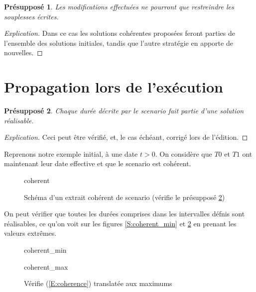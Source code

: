 \documentclass[10pt,a4paper]{article}
\newtheorem{presup}{Présupposé}
\begin{document}
\begin{presup}
Les modifications effectuées ne pourront que restreindre les souplesses écrites. \label{P:modif}
\end{presup}
\begin{proof}[Explication]
Dans ce cas les solutions cohérentes proposées feront parties de l'ensemble des solutions initiales, tandis que l'autre stratégie en apporte de nouvelles.
\end{proof}

\section{Propagation lors de l'exécution}

\begin{presup}
Chaque durée décrite par le scenario fait partie d'une solution réalisable. \label{P:coherent}
\end{presup}
\begin{proof}[Explication]
Ceci peut être vérifié, et, le cas échéant, corrigé lors de l'édition.
\end{proof}

Reprenons notre exemple initial, à une date $t>0$. On considère que $T0$ et $T1$ ont maintenant leur date effective et que le scenario est cohérent.

\begin{figure}[h]
\centering
	
	\schemaScenario coherent
	\caption{Schéma d'un extrait cohérent de scenario (vérifie le présupposé \ref{P:coherent})}
	\label{S:coherent}
\end{figure}
On peut vérifier que toutes les durées comprises dans les intervalles défnis sont réalisables, ce qu'on voit sur les figures \ref{S:coherent_min} et \ref{S:coherent_max} en prenant les valeurs extrêmes.

\begin{figure}[h]
\centering
	\begin{minipage}{.45\textwidth}
		
		\schemaScenario coherent_min
		\caption{Le scenario \ref{S:coherent} vérifie (\ref{E:coherence})}
		\label{S:coherent_min}
	\end{minipage} %
	\begin{minipage}{.45\textwidth}
		
		\schemaScenario coherent_max
		\caption{Vérifie (\ref{E:coherence}) translatée aux maximums}
		\label{S:coherent_max}
	\end{minipage} %
\end{figure}
\end{document}
